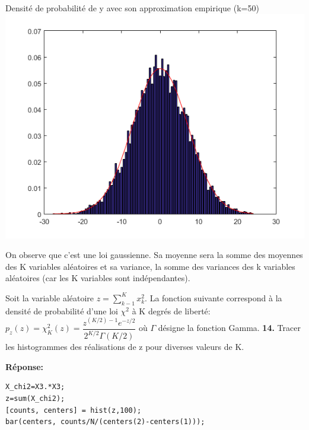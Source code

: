 \documentclass[12pt]{article}
\begin{document}
\begin{flushleft}
Densité de probabilité de y avec son approximation empirique (k=50)
\includegraphics{3_13_50.PNG}
\end{flushleft}

On observe que c'est une loi gaussienne. Sa moyenne sera la somme des moyennes des K variables aléatoires et sa variance, la somme des variances des k variables aléatoires (car les K variables sont indépendantes).
\smallbreak

Soit la variable aléatoire $z = \sum_{k-1}^{K} x_k^2$. La fonction suivante correspond à la densité de probabilité d'une loi $\chi^2$ à K degrés de liberté:
$
p_z(z)=\chi_K^2(z)=\dfrac{z^{(K/2)-1} e^{-z/2}}
{2^{K/2} \Gamma (K/2)}$
où $\Gamma$ désigne la fonction Gamma.
\smallbreak
\textbf{14. }Tracer les histogrammes des réalisations de z pour diverses valeurs de K.

\smallbreak
\textbf{Réponse:}

\begin{lstlisting}[style=Matlab-editor]
X_chi2=X3.*X3;
z=sum(X_chi2);
[counts, centers] = hist(z,100);
bar(centers, counts/N/(centers(2)-centers(1)));
\end{lstlisting}

\clearpage
\end{document}
